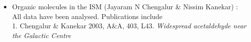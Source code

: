 \documentclass[11pt]{article}
\begin{document}
\begin{itemize}
\item{Organic molecules in the ISM (Jayaram N Chengalur \& Nissim Kanekar) : \\
All data have been analysed. Publications include\\
1. Chengalur \& Kanekar 2003, A\&A, 403, L43. {\it Widespread acetaldehyde near the Galactic Centre}}

\end{itemize}
\end{document}
